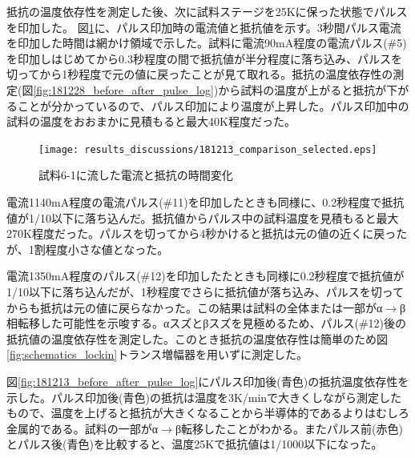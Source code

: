 抵抗の温度依存性を測定した後、次に試料ステージを25Kに保った状態でパルスを印加した。
図\ref{fig:181213_comparison_selected}に、パルス印加時の電流値と抵抗値を示す。3秒間パルス電流を印加した時間は網かけ領域で示した。試料に電流90mA程度の電流パルス(\#5)を印加しはじめてから0.3秒程度の間で抵抗値が半分程度に落ち込み、パルスを切ってから1秒程度で元の値に戻ったことが見て取れる。抵抗の温度依存性の測定(図\ref{fig:181228_before_after_pulse_log})から試料の温度が上がると抵抗が下がることが分かっているので、パルス印加により温度が上昇した。パルス印加中の試料の温度をおおまかに見積もると最大40K程度だった。
  \begin{figure}[!h]
    \begin{center}
   \texttt{[image: results\_discussions/181213\_comparison\_selected.eps]}
  \end{center}
  \caption{試料6-1に流した電流と抵抗の時間変化%
  }
  \label{fig:181213_comparison_selected}
  \end{figure}

電流1140mA程度の電流パルス(\#11)を印加したときも同様に、0.2秒程度で抵抗値が1/10以下に落ち込んだ。抵抗値からパルス中の試料温度を見積もると最大270K程度だった。パルスを切ってから4秒かけると抵抗は元の値の近くに戻ったが、1割程度小さな値となった。

電流1350mA程度のパルス(\#12)を印加したたときも同様に0.2秒程度で抵抗値が1/10以下に落ち込んだが、1秒程度でさらに抵抗値が落ち込み、パルスを切ってからも抵抗は元の値に戻らなかった。この結果は試料の全体または一部がα$\to$β相転移した可能性を示唆する。αスズとβスズを見極めるため、パルス(\#12)後の抵抗値の温度依存性を測定した。このとき抵抗の温度依存性は簡単のため図\ref{fig:schematics_lockin}トランス増幅器を用いずに測定した。

図\ref{fig:181213_before_after_pulse_log}にパルス印加後(青色)の抵抗温度依存性を示した。パルス印加後(青色)の抵抗は温度を3K/minで大きくしながら測定したもので、温度を上げると抵抗が大きくなることから半導体的であるよりはむしろ金属的である。試料の一部がα$\to$β転移したことがわかる。またパルス前(赤色)とパルス後(青色)を比較すると、温度25Kで抵抗値は1/1000以下になった。%

